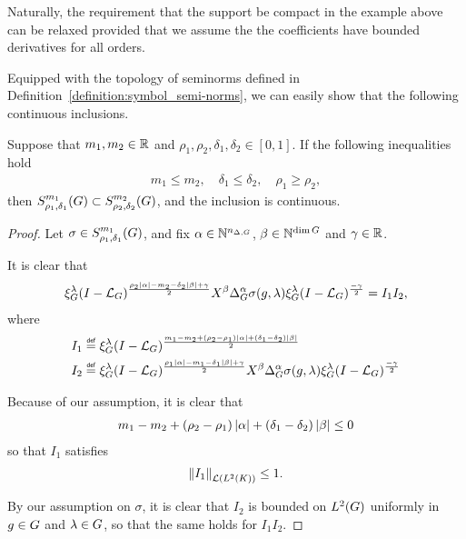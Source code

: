 Naturally,
the requirement that the support be compact in the example above can be relaxed
provided that we assume the the coefficients have bounded derivatives for all orders.

Equipped with the topology of seminorms defined in Definition~\ref{definition:symbol_semi-norms},
we can easily show that the following continuous inclusions.

\begin{lemma}
    Suppose that $m_1, m_2 \in \R$ and $\rho_1, \rho_2, \delta_1, \delta_2 \in [0, 1]$.
    If the following inequalities hold
    \begin{align*}
        m_1 \leq m_2, \quad \delta_1 \leq \delta_2, \quad \rho_1 \geq \rho_2,
    \end{align*}
    then $\SymbolClass {m_1} {\rho_1, \delta_1} \subset \SymbolClass {m_2} {\rho_2, \delta_2}$,
    and the inclusion is continuous.
\end{lemma}
\begin{proof}
    Let $\sigma \in \SymbolClass {m_1} {\rho_1, \delta_1}$,
    and fix $\alpha \in \N^{\dimDifferenceOperators}$, $\beta \in \N^{\dim \Group}$ and $\gamma \in \R$.

    It is clear that
    \begin{align*}
        \Rep{\lambda} \BesselPotential{\rho_2 \abs\alpha - m_2 - \delta_2 \abs\beta + \gamma}
        \LeftDifferentialOperator{\beta} \DifferenceOperatorOrder{\alpha} \sigma(g, \lambda)
        \Rep{\lambda} \BesselPotential{-\gamma}
        = I_1 I_2,
    \end{align*}
    where
    \begin{align*}
        I_1 &\defeq \Rep \lambda \BesselPotential {m_1 - m_2 + (\rho_2 - \rho_1) \abs \alpha + (\delta_1 - \delta_2) \abs \beta}\\
        I_2 &\defeq \Rep{\lambda} \BesselPotential{\rho_1 \abs\alpha - m_1 - \delta_1 \abs\beta + \gamma}
        \LeftDifferentialOperator{\beta} \DifferenceOperatorOrder{\alpha} \sigma(g, \lambda)
        \Rep{\lambda} \BesselPotential{-\gamma}
    \end{align*}

    Because of our assumption,
    it is clear that
    \begin{align*}
        m_1 - m_2 + (\rho_2 - \rho_1) \abs \alpha + (\delta_1 - \delta_2) \abs \beta \leq 0
    \end{align*}
    so that $I_1$ satisfies
    \begin{align*}
        \norm [\Lin {\Lebesgue 2 \CompactGroup}] {I_1}
        \leq 1.
    \end{align*}

    By our assumption on $\sigma$,
    it is clear that $I_2$ is bounded on $\Lebesgue 2 \Group$ uniformly in $g \in \Group$ and $\lambda \in \Group$,
    so that the same holds for $I_1 I_2$.
\end{proof}

